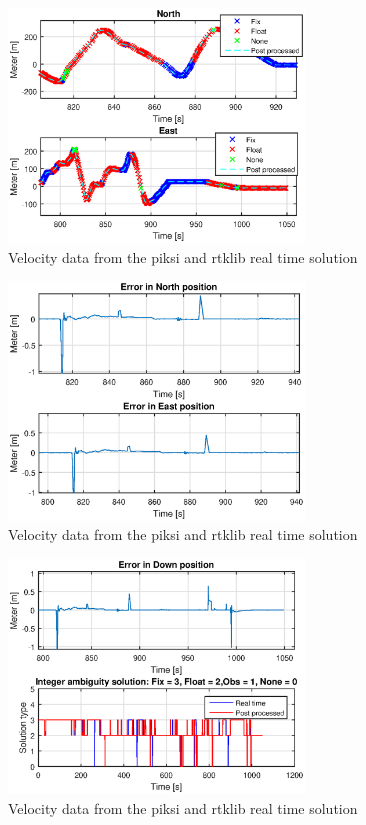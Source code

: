 \begin{figure}[H]
	\centering
		\includegraphics[width=0.7\textwidth]{figs/plots/landingNorthEastFlight.eps}
		\caption{Velocity data from the piksi and rtklib real time solution}
		\label{figure:numSatFlight}
\end{figure}
\begin{figure}[H]
	\centering
		\includegraphics[width=0.7\textwidth]{figs/plots/landingErrorNorthEastFlight.eps}
		\caption{Velocity data from the piksi and rtklib real time solution}
		\label{figure:numSatFlight}
\end{figure}
\begin{figure}[H]
	\centering
		\includegraphics[width=0.7\textwidth]{figs/plots/landingErrorDownFlight.eps}
		\caption{Velocity data from the piksi and rtklib real time solution}
		\label{figure:numSatFlight}
\end{figure}
